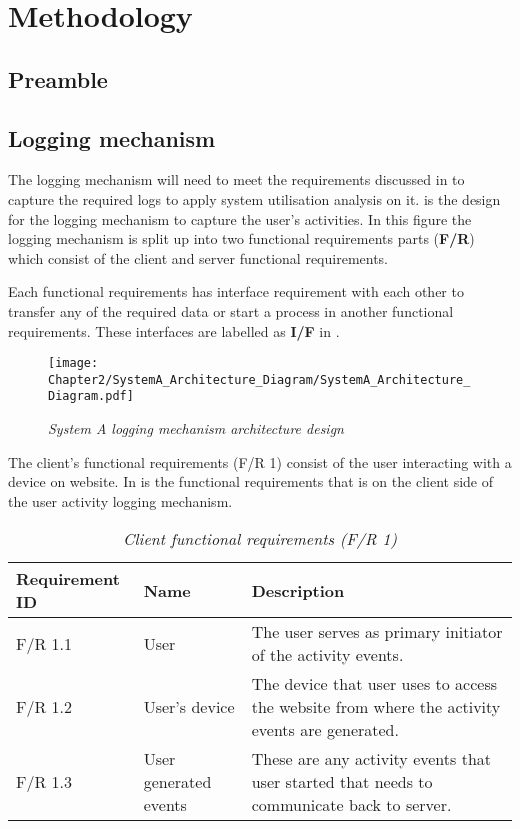 \chapter{Methodology}
\label{chap:2}

\section{Preamble}

\section{Logging mechanism}\label{Ch2:LoggingMechanism} The logging mechanism will need to meet the requirements discussed in  to capture the required logs to apply system utilisation analysis on it.  is the design for the logging mechanism to capture the user's activities. In this figure the logging mechanism is split up into two functional requirements parts (\textbf{F/R}) which consist of the client and server functional requirements.\par Each functional requirements has interface requirement with each other to transfer any of the required data or start a process in another functional requirements. These interfaces are labelled as \textbf{I/F} in .

\begin{figure}[!htb] %
	\centering %
	\texttt{[image: Chapter2/SystemA\_Architecture\_Diagram/SystemA\_Architecture\_Diagram.pdf]}
	\caption[System A logging mechanism architecture design]
	{\textit{System A logging mechanism architecture design}}\label{fig:CH2_SystemA_Arch_Design}
\end{figure}

The client's functional requirements (F/R 1) consist of the user interacting with a device on website. In  is the functional requirements that is on the client side of the user activity logging mechanism.

\begin{table}[!htb]
	\centering
	\small
	\caption[Client functional requirements]
	{\textit{Client functional requirements (F/R 1)}}
	\label{tbl:Ch2_Client_Functional_Requirements}
	\begin{tabularx}{\textwidth}{|l|l|X|}
		\hline \textbf{Requirement ID} & \textbf{Name} & \textbf{Description} \\
		\hline F/R 1.1 & User & The user serves as primary initiator of the activity events.\\
		\hline F/R 1.2 & User's device & The device that user uses to access the website from where the activity events are generated.\\
		\hline F/R 1.3 & User generated events & These are any activity events that user started that needs to communicate back to server.\\
		\hline
	\end{tabularx}
\end{table}

